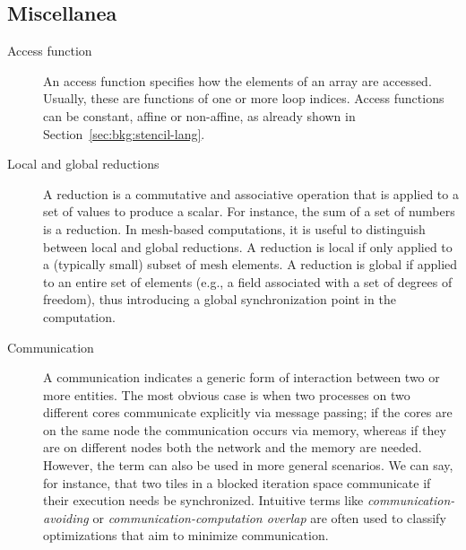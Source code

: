 \subsection*{Miscellanea}
\begin{description}

\item[Access function] An access function specifies how the elements of an array are accessed. Usually, these are functions of one or more loop indices. Access functions can be constant, affine or non-affine, as already shown in Section~\ref{sec:bkg:stencil-lang}.

\item[Local and global reductions] A reduction is a commutative and associative operation that is applied to a set of values to produce a scalar. For instance, the sum of a set of numbers is a reduction. In mesh-based computations, it is useful to distinguish between local and global reductions. A reduction is local if only applied to a (typically small) subset of mesh elements. A reduction is global if applied to an entire set of elements (e.g., a field associated with a set of degrees of freedom), thus introducing a global synchronization point in the computation. 

\item[Communication] A communication indicates a generic form of interaction between two or more entities. The most obvious case is when two processes on two different cores communicate explicitly via message passing; if the cores are on the same node the communication occurs via memory, whereas if they are on different nodes both the network and the memory are needed. However, the term can also be used in more general scenarios. We can say, for instance, that two tiles in a blocked iteration space communicate if their execution needs be synchronized. Intuitive terms like {\em communication-avoiding} or {\em communication-computation overlap} are often used to classify optimizations that aim to minimize communication. 
\end{description}

